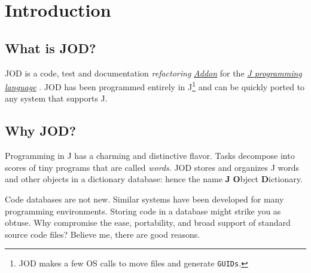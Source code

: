    \section{Introduction}
   
   \subsection{What is JOD?}
   
   JOD is a code, test and documentation \emph{refactoring} \href{https://www.jsoftware.com/jwiki/Addons}{\emph{Addon}} for the
     \href{https://www.jsoftware.com}{\emph{J programming language}} \cite{RKWHui:jdictionary}. JOD has been 
      programmed entirely in J\footnote{JOD makes a few OS calls to move files and generate \texttt{GUIDs}.}
      and can be quickly ported to any system that supports J.
   
   \subsection{Why JOD?}  
   
   Programming in J 
   has a charming and distinctive flavor.  Tasks decompose into scores of tiny
   programs that are called \emph{words}. JOD stores and organizes
   J words and other objects in a dictionary database: hence the 
   name \textbf{J} \textbf{O}bject \textbf{D}ictionary.
   
   Code  databases are not new.  Similar systems have 
   been developed for many programming
   environments. Storing code in a database might strike you as obtuse.  
   Why compromise the ease, portability, and broad support of standard source code  
   files? Believe me,
   there are good reasons.
   
